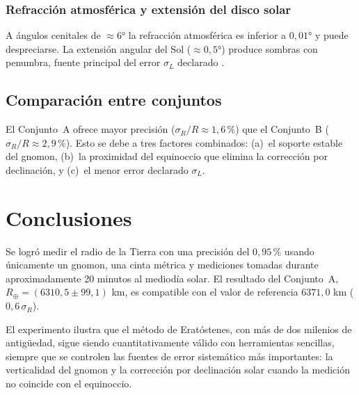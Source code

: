 \documentclass[stu,12pt,floatsintext]{apa7}
\begin{document}
\subsubsection*{Refracción atmosférica y extensión del disco solar}

A ángulos cenitales de $\approx 6°$ la refracción atmosférica es inferior a $0{,}01°$
y puede despreciarse. La extensión angular del Sol ($\approx 0{,}5°$) produce sombras con
penumbra, fuente principal del error $\sigma_L$ declarado \parencite{portilla2009elementos}.

\subsection{Comparación entre conjuntos}

El Conjunto~A ofrece mayor precisión ($\sigma_R/R \approx 1{,}6\,\%$) que el Conjunto~B
($\sigma_R/R \approx 2{,}9\,\%$). Esto se debe a tres factores combinados:
(a)~el soporte estable del gnomon, (b)~la proximidad del equinoccio que elimina la
corrección por declinación, y (c)~el menor error declarado $\sigma_L$.

\section{Conclusiones}

Se logró medir el radio de la Tierra con una precisión del $0{,}95\,\%$ usando únicamente
un gnomon, una cinta métrica y mediciones tomadas durante aproximadamente 20 minutos al
mediodía solar. El resultado del Conjunto~A, $R_\oplus = (6310{,}5 \pm 99{,}1)$ km, es
compatible con el valor de referencia $6371{,}0$ km ($0{,}6\,\sigma_R$).

El experimento ilustra que el método de Eratóstenes, con más de dos milenios de antigüedad,
sigue siendo cuantitativamente válido con herramientas sencillas, siempre que se controlen
las fuentes de error sistemático más importantes: la verticalidad del gnomon y la
corrección por declinación solar cuando la medición no coincide con el equinoccio.

\printbibliography
\end{document}

